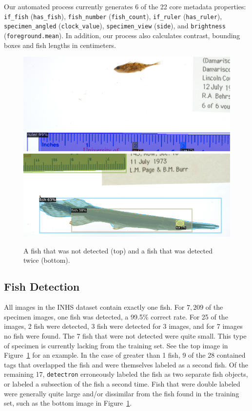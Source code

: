 \documentclass[conference]{IEEEtran}
\begin{document}
Our automated process currently generates 6 of the 22 core metadata properties: \verb|if_fish| (\verb|has_fish|), \verb|fish_number| (\verb|fish_count|), \verb|if_ruler| (\verb|has_ruler|), \verb|specimen_angled| (\verb|clock_value|), \verb|specimen_view| (\verb|side|), and \verb|brightness| (\verb|foreground.mean|).
In addition, our process also calculates contrast, bounding boxes and
fish lengths in centimeters.

\begin{figure}[t]
  \centering
  \includegraphics[width=0.9\linewidth]{images/none1_crop} \\
  \vspace{3mm}
  \includegraphics[width=0.9\linewidth]{images/double1_crop}
  \caption{A fish that was not detected (top) and a fish that was detected twice (bottom).}
  \label{fig:fish_detect_wrong}
\end{figure}

\subsection{Fish Detection}
All images in the INHS dataset contain exactly one fish. For \(7,209\) of the specimen images, one fish was detected, a 99.5\% correct rate.
For 25 of the images, 2 fish were detected, 3 fish were detected for 3 images, and for 7 images no fish were found.
The 7 fish that were not detected were quite small. This type of specimen 
is currently lacking from the training set.
See the top image in Figure~\ref{fig:fish_detect_wrong} for an example.
In the case of greater than 1 fish, 9 of the 28 contained tags that
overlapped the fish and were themselves labeled as a second fish.
Of the remaining 17, \verb|detectron| erroneously labeled the fish as two separate fish objects, or labeled a subsection of the fish a second time.
Fish that were double labeled were generally quite large and/or dissimilar from the fish found in the training set, such as the bottom image in
Figure~\ref{fig:fish_detect_wrong}.
\end{document}
